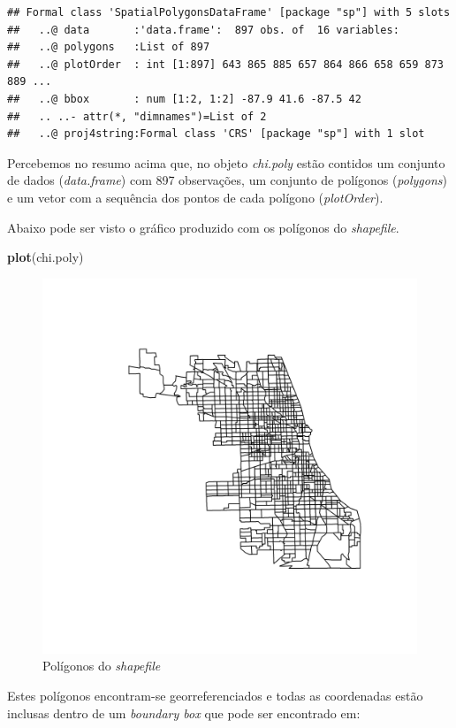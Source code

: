 \documentclass[12pt,]{article}
\newenvironment{Shaded}{\begin{snugshade}}{\end{snugshade}}
\newcommand{\KeywordTok}[1]{\textcolor[rgb]{0.13,0.29,0.53}{\textbf{#1}}}
\newcommand{\NormalTok}[1]{#1}
\begin{document}
\begin{verbatim}
## Formal class 'SpatialPolygonsDataFrame' [package "sp"] with 5 slots
##   ..@ data       :'data.frame':  897 obs. of  16 variables:
##   ..@ polygons   :List of 897
##   ..@ plotOrder  : int [1:897] 643 865 885 657 864 866 658 659 873 889 ...
##   ..@ bbox       : num [1:2, 1:2] -87.9 41.6 -87.5 42
##   .. ..- attr(*, "dimnames")=List of 2
##   ..@ proj4string:Formal class 'CRS' [package "sp"] with 1 slot
\end{verbatim}

Percebemos no resumo acima que, no objeto \emph{chi.poly} estão contidos
um conjunto de dados (\emph{data.frame}) com 897 observações, um
conjunto de polígonos (\emph{polygons}) e um vetor com a sequência dos
pontos de cada polígono (\emph{plotOrder}).

Abaixo pode ser visto o gráfico produzido com os polígonos do
\emph{shapefile}.

\begin{Shaded}
\begin{Highlighting}[]
\KeywordTok{plot}\NormalTok{(chi.poly)}
\end{Highlighting}
\end{Shaded}

\begin{figure}[H]

{\centering \includegraphics[width=0.65\linewidth]{sfiles/plot-1} 

}

\caption{Polígonos do \textit{shapefile}}\label{fig:plot}
\end{figure}

Estes polígonos encontram-se georreferenciados e todas as coordenadas
estão inclusas dentro de um \emph{boundary box} que pode ser encontrado
em:
\end{document}
